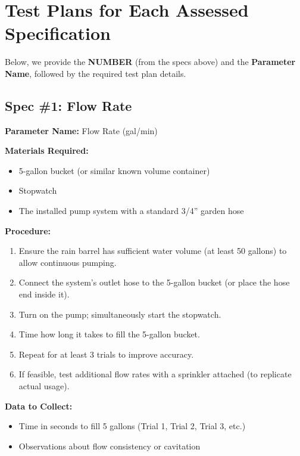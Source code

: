 \documentclass[12pt]{article}
\begin{document}
\newpage\section*{Test Plans for Each Assessed Specification}

Below, we provide the \textbf{NUMBER} (from the specs above) and the \textbf{Parameter Name}, followed by the required test plan details.

\subsection*{Spec \#1: Flow Rate}
\textbf{Parameter Name:} Flow Rate (gal/min)

\noindent
\textbf{Materials Required:}
\begin{itemize}
    \item 5-gallon bucket (or similar known volume container)
    \item Stopwatch
    \item The installed pump system with a standard 3/4'' garden hose
\end{itemize}

\noindent
\textbf{Procedure:}
\begin{enumerate}
    \item Ensure the rain barrel has sufficient water volume (at least 50 gallons) to allow continuous pumping.
    \item Connect the system’s outlet hose to the 5-gallon bucket (or place the hose end inside it).
    \item Turn on the pump; simultaneously start the stopwatch.
    \item Time how long it takes to fill the 5-gallon bucket.
    \item Repeat for at least 3 trials to improve accuracy.
    \item If feasible, test additional flow rates with a sprinkler attached (to replicate actual usage).
\end{enumerate}

\noindent
\textbf{Data to Collect:}
\begin{itemize}
    \item Time in seconds to fill 5 gallons (Trial 1, Trial 2, Trial 3, etc.)
    \item Observations about flow consistency or cavitation
\end{itemize}
\end{document}
